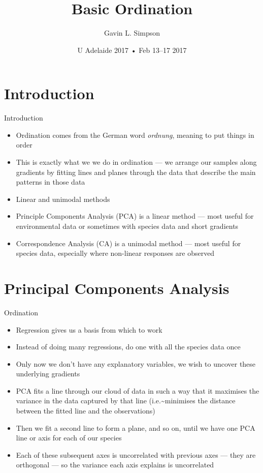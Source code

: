 \documentclass[10pt,ignorenonframetext,compress, aspectratio=169]{beamer}
\title{Basic Ordination}
\author{Gavin L. Simpson}
\date{U Adelaide 2017 • Feb 13--17 2017}
\providecommand{\tightlist}{%
  \setlength{\itemsep}{0pt}\setlength{\parskip}{0pt}}
\begin{document}
\frame{\titlepage}

\section{Introduction}\label{introduction}

\begin{frame}{Introduction}

\begin{itemize}
\tightlist
\item
  \alert{Ordination} comes from the German word \emph{ordnung}, meaning
  to put things in order
\item
  This is exactly what we we do in ordination --- we arrange our samples
  along gradients by fitting lines and planes through the data that
  describe the main patterns in those data
\item
  Linear and unimodal methods
\item
  Principle Components Analysis (PCA) is a linear method --- most useful
  for environmental data or sometimes with species data and short
  gradients
\item
  Correspondence Analysis (CA) is a unimodal method --- most useful for
  species data, especially where non-linear responses are observed
\end{itemize}

\end{frame}

\section{Principal Components
Analysis}\label{principal-components-analysis}

\begin{frame}{Ordination}

\begin{itemize}
\tightlist
\item
  Regression gives us a basis from which to work
\item
  Instead of doing many regressions, do one with all the species data
  once
\item
  Only now we don't have any explanatory variables, we wish to uncover
  these underlying gradients
\item
  PCA fits a line through our cloud of data in such a way that it
  maximises the variance in the data captured by that line
  (i.e.\textasciitilde{}minimises the distance between the fitted line
  and the observations)
\item
  Then we fit a second line to form a plane, and so on, until we have
  one PCA line or axis for each of our species
\item
  Each of these subsequent axes is uncorrelated with previous axes ---
  they are \alert{orthogonal} --- so the variance each axis explains is
  uncorrelated
\end{itemize}

\end{frame}
\end{document}
